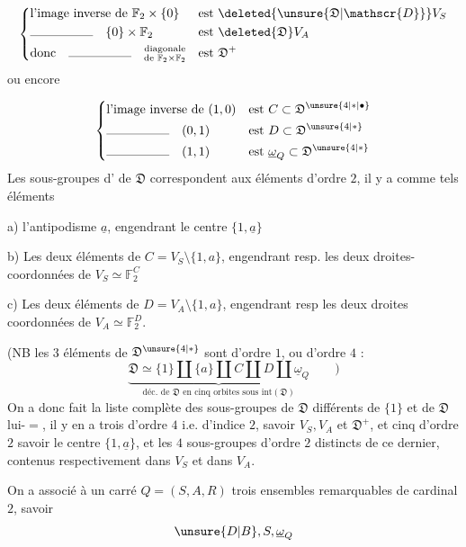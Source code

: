 \[
\left\{\begin{aligned}
&\text{l'image inverse de } \mathbb{F}_2\times\{0\} &&\text{est }\deleted{\unsure{\mathfrak{D}|\mathscr{D}}}V_S\\
&\rule{5em}{0.3pt}\quad \{0\}\times\mathbb{F}_2 &&\text{est }\deleted{\mathfrak{D}}V_A\\
&\text{donc}\quad\rule{5em}{0.3pt}\quad\substack{\text{diagonale}\\\text{de }\mathbb{F}_2\times\mathbb{F}_2} &&\text{est }\mathfrak{D}^+
\end{aligned}\right.
\]
ou encore 

\[
\left\{\begin{aligned}
&\text{l'image inverse de }(1,0) &&\text{est }C\subset\mathfrak{D}^{\unsure{4|*|\bullet}}\\
&\rule{5em}{0.3pt}\quad(0,1) &&\text{est }D\subset\mathfrak{D}^{\unsure{4|*}}\\
&\rule{5em}{0.3pt}\quad(1,1) &&\text{est }\underline\omega_Q\subset\mathfrak{D}^{\unsure{4|*}}
\end{aligned}\right.
\]
Les sous-groupes d' de $\mathfrak{D}$ correspondent aux éléments d'ordre $2$, il y a comme tels éléments

a) l'antipodisme $\underline a$, engendrant le centre $\{1,\underline a\}$

b) Les deux éléments de $C=V_S\setminus\{1,a\}$, engendrant resp. les deux droites-coordonnées de $V_S\simeq\mathbb{F}_2^C$

c) Les deux éléments de $D=V_A\setminus\{1,a\}$, engendrant resp les deux droites coordonnées de $V_A\simeq\mathbb{F}_2^D$.

(NB les  $3$ éléments de $\mathfrak{D}^{\unsure{4|*}}$ sont d'ordre $1$, ou d'ordre $4$ :
\[
\underbrace{\mathfrak{D}\simeq\{1\}\amalg\{a\}\amalg C\amalg D\amalg\underline\omega_Q}_{\text{déc. de }\mathfrak{D}\text{ en cinq orbites sous }\mathrm{int}(\mathfrak D)}\qquad)
\]
On a donc fait la liste complète des sous-groupes de $\mathfrak{D}$ différents de $\{1\}$ et de $\mathfrak{D}$ lui-$=$, il y en a trois d'ordre $4$ i.e. d'indice $2$, savoir $V_S,V_A$ et $\mathfrak{D}^+$, et cinq d'ordre $2$ savoir le centre $\{1,\underline a\}$, et les $4$  sous-groupes d'ordre $2$ distincts de ce dernier, contenus respectivement dans $V_S$ et dans $V_A$.

On a associé à un carré $Q=(S,A,R)$ trois ensembles remarquables de cardinal $2$, savoir
\[
\unsure{D|B},S,\underline\omega_Q
\]
